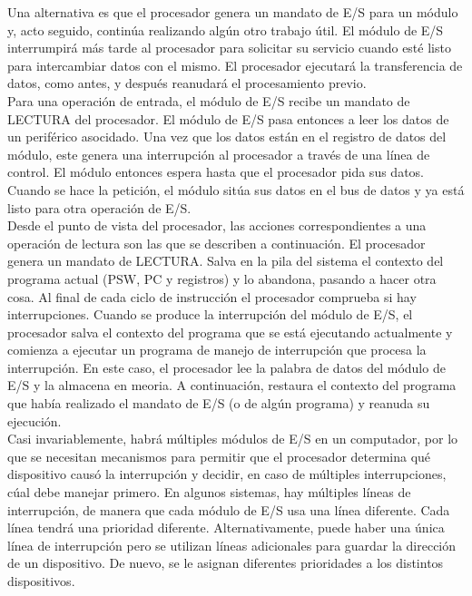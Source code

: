 \documentclass{article}
\begin{document}
							Una alternativa es que el procesador genera un mandato de E/S para un módulo y, acto seguido, continúa realizando algún otro trabajo útil. El módulo de E/S interrumpirá más tarde al procesador para solicitar su servicio cuando esté listo para intercambiar datos con el mismo. El procesador ejecutará la transferencia de datos, como antes, y después reanudará el procesamiento previo. \\
							
							Para una operación de entrada, el módulo de E/S recibe un mandato de LECTURA del procesador. El módulo de E/S pasa entonces a leer los datos de un periférico asocidado. Una vez que los datos están en el registro de datos del módulo, este genera una interrupción al procesador a través de una línea de control. El módulo entonces espera hasta que el procesador pida sus datos. Cuando se hace la petición, el módulo sitúa sus datos en el bus de datos y ya está listo para otra operación de E/S. \\
							
							Desde el punto de vista del procesador, las acciones correspondientes a una operación de lectura son las que se describen a continuación. El procesador genera un mandato de LECTURA. Salva en la pila del sistema el contexto del programa actual (PSW, PC y registros) y lo abandona, pasando a hacer otra cosa. Al final de cada ciclo de instrucción el procesador comprueba si hay interrupciones. Cuando se produce la interrupción del módulo de E/S, el procesador salva el contexto del programa que se está ejecutando actualmente y comienza a ejecutar un programa de manejo de interrupción que procesa la interrupción. En este caso, el procesador lee la palabra de datos del módulo de E/S y la almacena en meoria. A continuación, restaura el contexto del programa que había realizado el mandato de E/S (o de algún programa) y reanuda su ejecución. \\
							
							Casi invariablemente, habrá múltiples módulos de E/S en un computador, por lo que se necesitan mecanismos para permitir que el procesador determina qué dispositivo causó la interrupción y decidir, en caso de múltiples interrupciones, cúal debe manejar primero. En algunos sistemas, hay múltiples líneas de interrupción, de manera que cada módulo de E/S usa una línea diferente. Cada línea tendrá una prioridad diferente. Alternativamente, puede haber una única línea de interrupción pero se utilizan líneas adicionales para guardar la dirección de un dispositivo. De nuevo, se le asignan diferentes prioridades a los distintos dispositivos.
							
\end{document}
